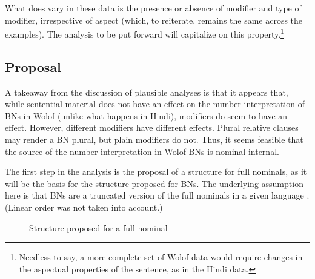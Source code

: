 \documentclass[output=paper]{langscibook}
\begin{document}
\noindent   What does vary in these data is the presence or absence of modifier and type of modifier, irrespective of aspect (which, to reiterate, remains the same across the examples). The analysis to be put forward will capitalize on this property.\footnote{Needless to say, a more complete set of Wolof data would require changes in the aspectual properties of the sentence, as in the Hindi data.}
	
\subsection{Proposal}

A takeaway from the discussion of plausible analyses is that it appears that, while sentential material does not have an effect on the number interpretation of BNs in Wolof (unlike what happens in Hindi), modifiers do seem to have an effect. However, different modifiers have different effects. Plural relative clauses may render a BN plural, but plain modifiers do not. Thus, it seems feasible that the source of the number interpretation in Wolof BNs is nominal-internal.
	
The first step in the analysis is the proposal of a structure for full nominals, as it will be the basis for the structure proposed for BNs. The underlying assumption here is that BNs are a truncated version of the full nominals in a given language \citep{massam2001pseudo}. (Linear order was not taken into account.)
	
	
\begin{figure}
\centering
{}
\caption{Structure proposed for a full nominal}
\label{fon:bzKTrEeEinDef}
\end{figure}
	
	
\end{document}
